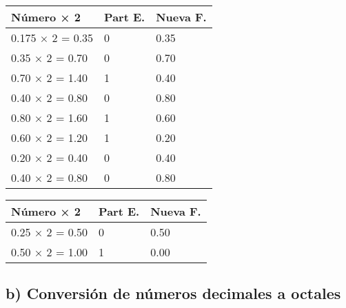 \documentclass[12pt]{article}
\begin{document}
\begin{table}[H]
\centering
\begin{minipage}[t]{0.48\textwidth}
\centering
\begin{tabular}{lll}
\toprule
\textbf{Número × 2} & \textbf{Part E.} & \textbf{Nueva F.} \\
\midrule
0.175 × 2 = 0.35 & 0 & 0.35 \\
0.35 × 2 = 0.70 & 0 & 0.70 \\
0.70 × 2 = 1.40 & 1 & 0.40 \\
0.40 × 2 = 0.80 & 0 & 0.80 \\
0.80 × 2 = 1.60 & 1 & 0.60 \\
0.60 × 2 = 1.20 & 1 & 0.20 \\
0.20 × 2 = 0.40 & 0 & 0.40 \\
0.40 × 2 = 0.80 & 0 & 0.80 \\


\bottomrule
\end{tabular}
\end{minipage}
\hfill
\begin{minipage}[t]{0.48\textwidth}
\centering
\begin{tabular}{lll}
\midrule
\textbf{Número × 2} & \textbf{Part E.} & \textbf{Nueva F.} \\
\midrule
0.25 × 2 = 0.50 & 0 & 0.50 \\
0.50 × 2 = 1.00 & 1 & 0.00 \\
\bottomrule
\end{tabular}
\end{minipage}
\end{table}





\subsection*{b) Conversión de números decimales a octales}
\end{document}
